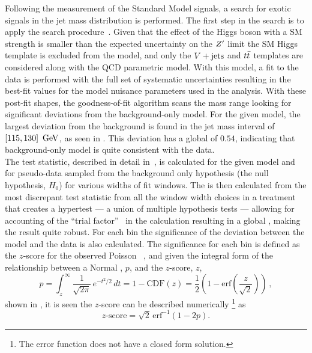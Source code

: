 Following the measurement of the Standard Model signals, a search for exotic signals in the \largeR jet mass distribution is performed.
The first step in the search is to apply the \BumpHunter{} search procedure~\cite{Aaltonen:2008vt,Choudalakis:2011qn}.
Given that the effect of the Higgs boson with a SM strength is smaller than the expected uncertainty on the $Z'$ limit the SM Higgs template is excluded from the model, and only the $V + \text{jets}$ and $t\bar{t}$ templates are considered along with the QCD parametric model.
With this model, a fit to the data is performed with the full set of systematic uncertainties resulting in the best-fit values for the model nuisance parameters used in the analysis.
With these post-fit shapes, the \BumpHunter{} goodness-of-fit algorithm scans the mass range looking for significant deviations from the background-only model.
For the given model, the largest deviation from the background is found in the \largeR jet mass interval of $\left[115,130\right]~\mathrm{GeV}$, as seen in .
This deviation has a \BumpHunter{} global \pvalue{} of $0.54$, indicating that background-only model is quite consistent with the data.\\

The \BumpHunter{} test statistic, described in detail in~\cite{Choudalakis:2011qn}, is calculated for the given model and for pseudo-data sampled from the background only hypothesis (the null hypothesis, $H_{0}$) for various widths of fit windows.
The \BumpHunter{} \pvalue{} is then calculated from the most discrepant test statistic from all the window width choices in a treatment that creates a hypertest --- a union of multiple hypothesis tests --- allowing for accounting of the ``trial factor''~\cite{Gross:2010qma} in the calculation resulting in a global \pvalue{}, making the result quite robust.
For each bin the significance of the deviation between the model and the data is also calculated.
The significance for each bin is defined as the $z$-score for the observed Poisson \pvalue{}~\cite{Choudalakis:2012}, and given the integral form of the relationship between a Normal \pvalue{}, $p$, and the $z$-score, $z$,
\[
 p = \int_{z}^{\infty} \frac{1}{\sqrt{2\pi}}\,e^{-t^2/2}\,dt = 1 - \mathrm{CDF}\left(z\right) = \frac{1}{2}\left(1 - \mathrm{erf}\left(\frac{z}{\sqrt{2}}\right)\right)\,,
\]
shown in , it is seen the $z$-score can be described numerically%
\footnote{The error function does not have a closed form solution.}
as
\[
 z\textrm{-score} = \sqrt{2}\, \mathrm{erf}^{-1}\left(1-2p\right).
\]

